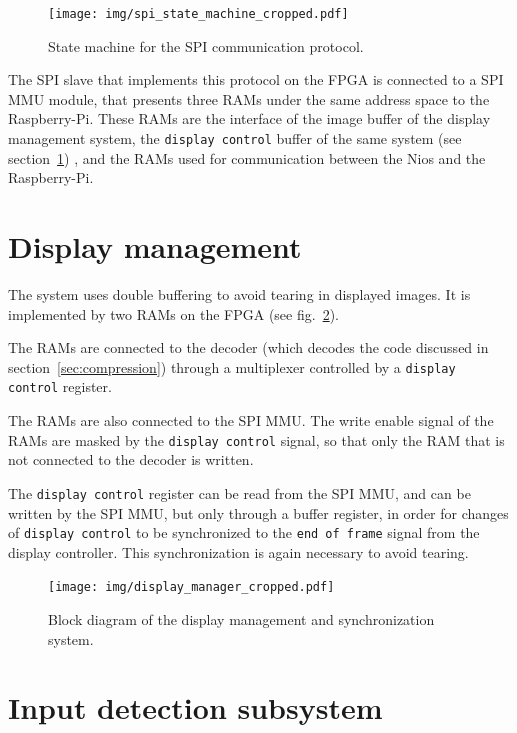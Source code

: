 \documentclass[english, DIV=13]{scrreprt}
\begin{document}
\begin{figure}[bth]
    \centering
    \texttt{[image: img/spi\_state\_machine\_cropped.pdf]}
    \caption{State machine for the SPI communication protocol.}
    \label{fig:spi}
\end{figure}

The SPI slave that implements this protocol on the FPGA is connected to a SPI MMU module,
that presents three RAMs under the same address space to the Raspberry-Pi.
These RAMs are the interface of the image buffer of the display management system,
the \texttt{display control} buffer of the same system (see section~\ref{sec:display-mngt})
, and the RAMs used for communication between the Nios and the Raspberry-Pi.

\section{Display management}
\label{sec:display-mngt}

The system uses double buffering to avoid tearing in displayed images.
It is implemented by two RAMs on the FPGA (see fig.~\ref{fig:display-manager}).

The RAMs are connected to the decoder
(which decodes the code discussed in section~\ref{sec:compression})
through a multiplexer controlled by a \texttt{display control} register.

The RAMs are also connected to the SPI MMU. The write enable
signal of the RAMs are masked by the \texttt{display control} signal,
so that only the RAM that is not connected to the decoder is written.

The \texttt{display control} register can be read from the SPI MMU,
and can be written by the SPI MMU, but only through a buffer register,
in order for changes of \texttt{display control} to be synchronized
to the \texttt{end of frame} signal from the display controller.
This synchronization is again necessary to avoid tearing.

\begin{figure}[bth]
    \centering
    \texttt{[image: img/display\_manager\_cropped.pdf]}
    \caption{Block diagram of the display management and synchronization system.}
    \label{fig:display-manager}
\end{figure}

\section{Input detection subsystem}
\label{sec:input-det}
\end{document}
